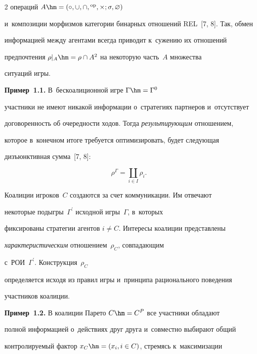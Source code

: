 \begin{multicols}{2}
операций ${A}\hm= (\circ, \cup, \cap, {}^{\mathrm{op}}, \times; \sigma, \varnothing)$ 

и~композиции морфизмов категории бинарных отношений REL~[7, 8]. Так, обмен 

информацией между агентами всегда приводит к~сужению их отношений 

предпочтения $\rho\vert_A \hm= \rho\cap A^2$ на некоторую часть~$A$ множества 

ситуаций игры.

    

    \textbf{Пример~1.1.} В~бескоалиционной игре $\Gamma\hm= \Gamma^0$ 

участ\-ни\-ки не имеют никакой информации о~стратегиях партнеров и~отсутствует 

до\-го\-во\-рен\-ность об оче\-ред\-ности ходов. Тогда \textit{ре\-зуль\-ти\-ру\-ющим} отношением, 

которое в~конечном итоге требуется оптимизировать, будет сле\-ду\-ющая 

дизъ\-юнк\-тив\-ная сумма~[7, 8]:

    \begin{equation}

    \rho^{\Gamma}= \coprod\limits_{i\in I} \rho_i.

    \label{e1.1-vas}

    \end{equation}

    

    Коалиции игроков~$C$ создаются за счет коммуникации. Им отвечают 

некоторые подыг\-ры~$\Gamma^\prime$ исходной игры~$\Gamma$, в~которых 

фиксированы стратегии агентов $i \not= C$. Интересы коалиции пред\-став\-ле\-ны 

\textit{характеристическим} отношением~$\rho_C$, сов\-па\-да\-ющим 

с~РОИ~$\Gamma^\prime$. Конструкция~$\rho_C$ 

определяется исходя из правил игры и~принципа рационального поведения 

участ\-ни\-ков коалиции. 

    

    \textbf{Пример~1.2.} В коалиции Парето $C\hm= C^P$ все участники обладают 

полной информацией о~действиях друг друга и~со\-вмест\-но выбирают общий 

конт\-ро\-ли\-ру\-емый фактор $x_C\hm= (x_i, i\in C)$, стремясь к~максимизации 


\end{multicols}
